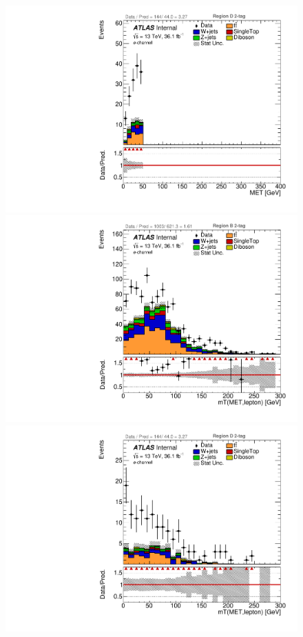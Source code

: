 \begin{figure}[!htbp]
\begin{center}
\includegraphics[scale=0.23]{./figures/boosted/ABCD/elec_Inc_RegionD_MET}\\
\includegraphics[scale=0.23]{./figures/boosted/ABCD/elec_Inc_RegionB_WlepMtATLAS}
\includegraphics[scale=0.23]{./figures/boosted/ABCD/elec_Inc_RegionD_WlepMtATLAS}\\

\end{center}
\end{figure}
